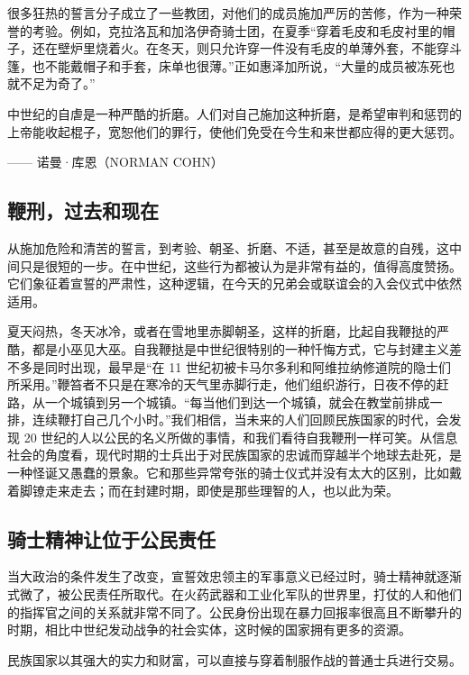很多狂热的誓言分子成立了一些教团，对他们的成员施加严厉的苦修，作为一种荣誉的考验。例如，克拉洛瓦和加洛伊奇骑士团，在夏季“穿着毛皮和毛皮衬里的帽子，还在壁炉里烧着火。在冬天，则只允许穿一件没有毛皮的单薄外套，不能穿斗篷，也不能戴帽子和手套，床单也很薄。”正如惠泽加所说，“大量的成员被冻死也就不足为奇了。”

\begin{tcolorbox}
\kaishu 中世纪的自虐是一种严酷的折磨。人们对自己施加这种折磨，是希望审判和惩罚的上帝能收起棍子，宽恕他们的罪行，使他们免受在今生和来世都应得的更大惩罚。
\begin{flushright}
—— 诺曼·库恩（NORMAN COHN）
\end{flushright}
\end{tcolorbox}


\subsection{鞭刑，过去和现在}
从施加危险和清苦的誓言，到考验、朝圣、折磨、不适，甚至是故意的自残，这中间只是很短的一步。在中世纪，这些行为都被认为是非常有益的，值得高度赞扬。它们象征着宣誓的严肃性，这种逻辑，在今天的兄弟会或联谊会的入会仪式中依然适用。

夏天闷热，冬天冰冷，或者在雪地里赤脚朝圣，这样的折磨，比起自我鞭挞的严酷，都是小巫见大巫。自我鞭挞是中世纪很特别的一种忏悔方式，它与封建主义差不多是同时出现，最早是“在 11 世纪初被卡马尔多利和阿维拉纳修道院的隐士们所采用。”鞭笞者不只是在寒冷的天气里赤脚行走，他们组织游行，日夜不停的赶路，从一个城镇到另一个城镇。“每当他们到达一个城镇，就会在教堂前排成一排，连续鞭打自己几个小时。”我们相信，当未来的人们回顾民族国家的时代，会发现 20 世纪的人以公民的名义所做的事情，和我们看待自我鞭刑一样可笑。从信息社会的角度看，现代时期的士兵出于对民族国家的忠诚而穿越半个地球去赴死，是一种怪诞又愚蠢的景象。它和那些异常夸张的骑士仪式并没有太大的区别，比如戴着脚镣走来走去；而在封建时期，即使是那些理智的人，也以此为荣。

\subsection{骑士精神让位于公民责任}
当大政治的条件发生了改变，宣誓效忠领主的军事意义已经过时，骑士精神就逐渐式微了，被公民责任所取代。在火药武器和工业化军队的世界里，打仗的人和他们的指挥官之间的关系就非常不同了。公民身份出现在暴力回报率很高且不断攀升的时期，相比中世纪发动战争的社会实体，这时候的国家拥有更多的资源。

民族国家以其强大的实力和财富，可以直接与穿着制服作战的普通士兵进行交易。

